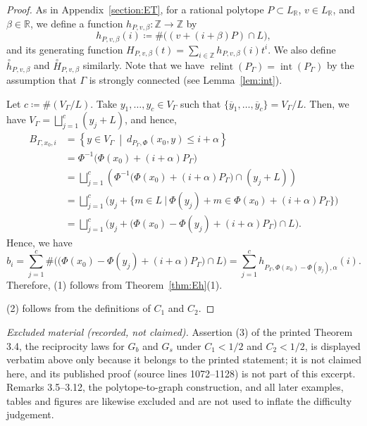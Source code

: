 \documentclass[10pt,a4paper]{amsart}
\theoremstyle{plain}
\theoremstyle{definition}
\theoremstyle{remark}
\begin{document}
\begin{proof}
As in Appendix~\ref{section:ET}, 
for a rational polytope $P \subset L_{\mathbb{R}}$, $v \in L_{\mathbb{R}}$, and $\beta \in \mathbb{R}$, 
we define a function $h_{P, v, \beta}: \mathbb{Z} \to \mathbb{Z}$ by
\[
h_{P,v,\beta}(i) \coloneqq  \# \bigl( (v+(i+\beta)P) \cap L \bigr), 
\]
and its generating function $H_{P,v,\beta}(t) = \sum _{i \in \mathbb{Z}} h_{P,v,\beta}(i)t^i$. 
We also define $\overset{\circ}{h}_{P,v,\beta}$ and $\overset{\circ}{H}_{P,v,\beta}$ similarly. 
Note that we have $\operatorname{relint}(P_{\Gamma}) = \operatorname{int}(P_{\Gamma})$ by the assumption that $\Gamma$ is strongly connected (see Lemma~\ref{lem:int}).


Let $c \coloneqq  \#(V_{\Gamma}/L)$. Take $y_1, \ldots, y_c \in V_{\Gamma}$ such that 
$\{ \overline{y}_1, \ldots , \overline{y}_c \} = V_{\Gamma} /L$. 
Then, we have $V_{\Gamma} = \bigsqcup _{j = 1} ^c (y_j + L)$, and hence, 
\begin{align*}
B_{\Gamma, x_0,i}
&= \left \{ y \in V_{\Gamma} \ \middle | \  d_{P_{\Gamma}, \Phi} (x_0, y) \le i + \alpha \right \} \\
&= \Phi^{-1}\bigl( \Phi (x_0) + (i + \alpha)P_{\Gamma} \bigr) \\
&= \bigsqcup _{j = 1} ^c \left( \Phi^{-1}\bigl( \Phi (x_0) + (i + \alpha)P_{\Gamma} \bigr) \cap (y_j + L) \right) \\
&= \bigsqcup _{j = 1} ^c \bigl( y_j + \bigl \{ m \in L \ \big | \ \Phi(y_j) + m \in \Phi(x_0) +  (i + \alpha)P_{\Gamma} \bigr \} \bigr) \\
&= \bigsqcup _{j = 1} ^c \bigl( y_j + \bigl( \Phi (x_0) - \Phi(y_j) + (i + \alpha) P_{\Gamma} \bigr) \cap L \bigr). 
\end{align*}
Hence, we have 
\[
b_i = \sum _{j=1}^c \# \bigl( \bigl( \Phi (x_0) - \Phi(y_j) + (i + \alpha) P_{\Gamma} \bigr) \cap L \bigr) 
= \sum _{j = 1} ^c h_{P_{\Gamma}, \Phi (x_0) - \Phi(y_j), \alpha}(i). 
\]
Therefore, (1) follows from Theorem~\ref{thm:Eh}(1). 

(2) follows from the definitions of $C_1$ and $C_2$. 

\end{proof}

\noindent\textit{Excluded material (recorded, not claimed).} Assertion (3) of the printed Theorem 3.4, the reciprocity laws for $G_b$ and $G_s$ under $C_1<1/2$ and $C_2<1/2$, is displayed verbatim above only because it belongs to the printed statement; it is not claimed here, and its published proof (source lines 1072--1128) is not part of this excerpt. Remarks 3.5--3.12, the polytope-to-graph construction, and all later examples, tables and figures are likewise excluded and are not used to inflate the difficulty judgement.
\appendix
\end{document}
